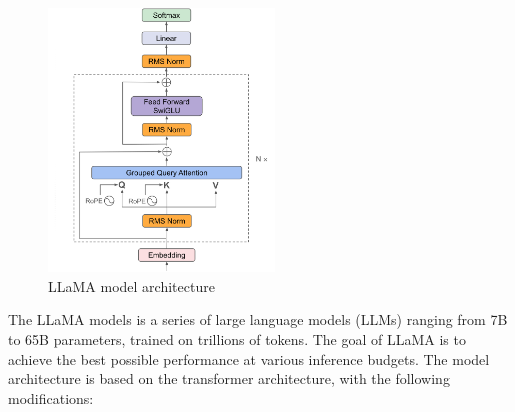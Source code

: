 \documentclass{article}
\begin{document}
		\begin{figure}[h]
			\centering
			\includegraphics[width=6cm]{llama}
			\caption{LLaMA model architecture}
		\end{figure}
		
		The LLaMA models \cite{touvron2023llamaopenefficientfoundation} is a series of large language models (LLMs) ranging from 7B to 65B parameters, trained on trillions of tokens. 
		The goal of LLaMA is to achieve the best possible performance at various inference budgets.
		The model architecture is based on the transformer architecture, with the following modifications:
		
\end{document}
